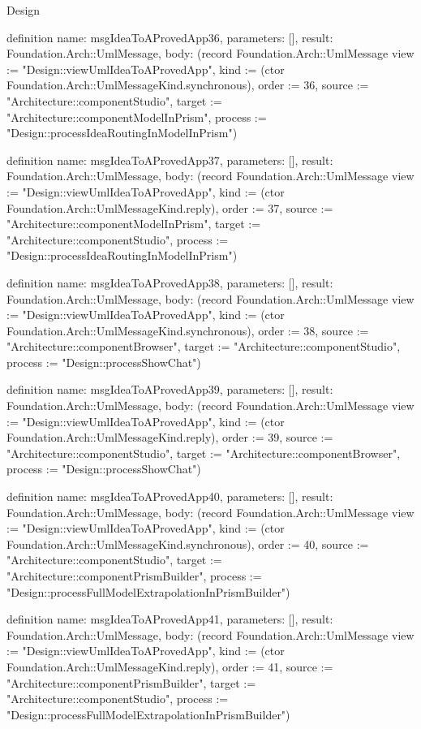 \begin{lexlean}{Design}
\begin{semanticmodule}
definition{
  name: msgIdeaToAProvedApp36,
  parameters: [],
  result: Foundation.Arch::UmlMessage,
  body: (record Foundation.Arch::UmlMessage {view := "Design::viewUmlIdeaToAProvedApp", kind := (ctor Foundation.Arch::UmlMessageKind.synchronous), order := 36, source := "Architecture::componentStudio", target := "Architecture::componentModelInPrism", process := "Design::processIdeaRoutingInModelInPrism"})
}

definition{
  name: msgIdeaToAProvedApp37,
  parameters: [],
  result: Foundation.Arch::UmlMessage,
  body: (record Foundation.Arch::UmlMessage {view := "Design::viewUmlIdeaToAProvedApp", kind := (ctor Foundation.Arch::UmlMessageKind.reply), order := 37, source := "Architecture::componentModelInPrism", target := "Architecture::componentStudio", process := "Design::processIdeaRoutingInModelInPrism"})
}

definition{
  name: msgIdeaToAProvedApp38,
  parameters: [],
  result: Foundation.Arch::UmlMessage,
  body: (record Foundation.Arch::UmlMessage {view := "Design::viewUmlIdeaToAProvedApp", kind := (ctor Foundation.Arch::UmlMessageKind.synchronous), order := 38, source := "Architecture::componentBrowser", target := "Architecture::componentStudio", process := "Design::processShowChat"})
}

definition{
  name: msgIdeaToAProvedApp39,
  parameters: [],
  result: Foundation.Arch::UmlMessage,
  body: (record Foundation.Arch::UmlMessage {view := "Design::viewUmlIdeaToAProvedApp", kind := (ctor Foundation.Arch::UmlMessageKind.reply), order := 39, source := "Architecture::componentStudio", target := "Architecture::componentBrowser", process := "Design::processShowChat"})
}

definition{
  name: msgIdeaToAProvedApp40,
  parameters: [],
  result: Foundation.Arch::UmlMessage,
  body: (record Foundation.Arch::UmlMessage {view := "Design::viewUmlIdeaToAProvedApp", kind := (ctor Foundation.Arch::UmlMessageKind.synchronous), order := 40, source := "Architecture::componentStudio", target := "Architecture::componentPrismBuilder", process := "Design::processFullModelExtrapolationInPrismBuilder"})
}

definition{
  name: msgIdeaToAProvedApp41,
  parameters: [],
  result: Foundation.Arch::UmlMessage,
  body: (record Foundation.Arch::UmlMessage {view := "Design::viewUmlIdeaToAProvedApp", kind := (ctor Foundation.Arch::UmlMessageKind.reply), order := 41, source := "Architecture::componentPrismBuilder", target := "Architecture::componentStudio", process := "Design::processFullModelExtrapolationInPrismBuilder"})
}


\end{semanticmodule}
\end{lexlean}
